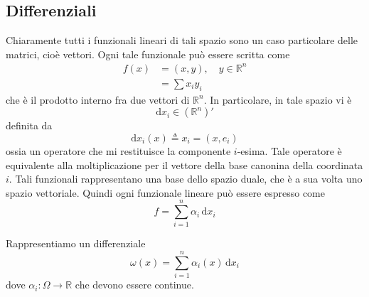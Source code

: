 \documentclass[a4paper]{article}
\begin{document}

\pagebreak

\subsection{Differenziali}


Chiaramente tutti i funzionali lineari di tali spazio sono un caso particolare
delle matrici, cioè vettori. Ogni tale funzionale può essere scritta come
\begin{align*}
    f(x) &= (x,y), \quad y\in \mathbb{R}^n \\
    &= \sum x_i y_i
\end{align*}
che è il prodotto interno fra due vettori di \(\mathbb{R}^n\).
In particolare, in tale spazio vi è
\[
    \text{d}x_i \in \left(\mathbb{R}^n\right)'
\]
definita da
\[
    \text{d}x_i(x) \triangleq x_i = (x, e_i)
\]
ossia un operatore che mi restituisce la componente \(i\)-esima.
Tale operatore è equivalente alla moltiplicazione per il vettore della base
canonina della coordinata \(i\).
Tali funzionali rappresentano una base dello spazio duale, che è a sua volta uno spazio vettoriale.
Quindi ogni funzionale lineare può essere espresso come
\[
    f = \sum_{i=1}^n \alpha_i \,\text{d}x_i
\]


Rappresentiamo un differenziale
\[
    \omega(x) = \sum_{i=1}^n \alpha_i(x) \,\text{d}x_i
\]
dove \(\alpha_i \colon \Omega \to \mathbb{R}\) che devono essere continue.

\end{document}
